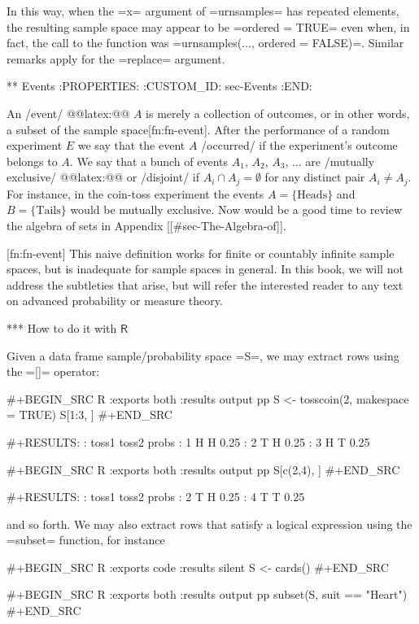 In this way, when the =x= argument of =urnsamples= has repeated
elements, the resulting sample space may appear to be =ordered = TRUE=
even when, in fact, the call to the function was =urnsamples(...,
ordered = FALSE)=. Similar remarks apply for the =replace= argument.

** Events
:PROPERTIES:
:CUSTOM_ID: sec-Events
:END:

An /event/ @@latex:@@ \(A\) is merely a collection of outcomes, or
in other words, a subset of the sample space[fn:fn-event]. After the
performance of a random experiment \(E\) we say that the event \(A\)
/occurred/ if the experiment's outcome belongs to \(A\). We say that a
bunch of events \(A_{1}\), \(A_{2}\), \(A_{3}\), ... are /mutually
exclusive/ @@latex:@@ or /disjoint/ if \(A_{i}\cap
A_{j}=\emptyset\) for any distinct pair \(A_{i}\neq A_{j}\). For
instance, in the coin-toss experiment the events \( A = \{
\mbox{Heads} \}\) and \( B = \{ \mbox{Tails} \} \) would be mutually
exclusive. Now would be a good time to review the algebra of sets in
Appendix [[#sec-The-Algebra-of]].

[fn:fn-event] This naive definition works for finite or countably
infinite sample spaces, but is inadequate for sample spaces in
general. In this book, we will not address the subtleties that arise,
but will refer the interested reader to any text on advanced
probability or measure theory.

*** How to do it with \(\mathsf{R}\)

Given a data frame sample/probability space =S=, we may extract rows
using the =[]= operator:

#+BEGIN_SRC R :exports both :results output pp   
S <- tosscoin(2, makespace = TRUE) 
S[1:3, ] 
#+END_SRC

#+RESULTS:
:   toss1 toss2 probs
: 1     H     H  0.25
: 2     T     H  0.25
: 3     H     T  0.25

#+BEGIN_SRC R :exports both :results output pp   
S[c(2,4), ] 
#+END_SRC

#+RESULTS:
:   toss1 toss2 probs
: 2     T     H  0.25
: 4     T     T  0.25

and so forth. We may also extract rows that satisfy a logical
expression using the =subset= function, for instance

#+BEGIN_SRC R :exports code :results silent
S <- cards() 
#+END_SRC 

#+BEGIN_SRC R :exports both :results output pp  
subset(S, suit == "Heart") 
#+END_SRC


